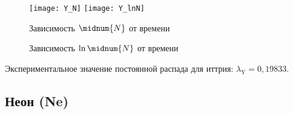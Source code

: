     \begin{figure}[h!]
        \center
        \texttt{[image: Y\_N]} \hfill
        \texttt{[image: Y\_lnN]}
        \parbox{.47\textwidth}{\caption{Зависимость \( \midnum{N} \) от времени}} \hfill
        \parbox{.47\textwidth}{\caption{Зависимость \( \ln \midnum{N} \) от времени}}
    \end{figure}

    Экспериментальное значение постоянной распада для иттрия:
    \( \lambda_\mathrm{Y} = 0,\!19833 \).

    \newpage

    \subsection{Неон (Ne)}
    \vspace*{-1em}

